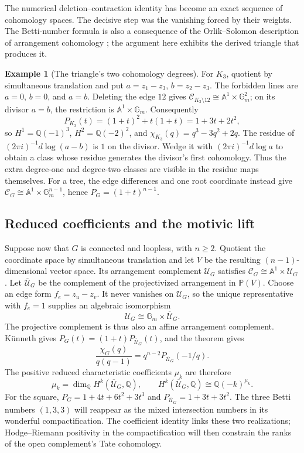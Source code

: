 \documentclass[11pt]{article}
\theoremstyle{definition}
\newtheorem{example}[theorem]{Example}
\theoremstyle{remark}
\newcommand{\Q}{\mathbb Q}
\newcommand{\A}{\mathbb A}
\newcommand{\Gm}{\mathbb G_m}
\begin{document}
The numerical deletion--contraction identity has become an exact sequence
of cohomology spaces. The decisive step was the vanishing forced by their
weights. The Betti-number formula is also a consequence of the
Orlik--Solomon description of arrangement cohomology
\cite[Theorem 5.2 and formula (1.4)]{dagOrlikSolomon1980}; the argument here
exhibits the derived triangle that produces it.

\begin{example}[The triangle's two cohomology degrees]
For $K_3$, quotient by simultaneous translation and put
$a=z_1-z_3$, $b=z_2-z_3$. The forbidden lines are $a=0$, $b=0$, and $a=b$.
Deleting the edge $12$ gives
$\mathcal C_{K_3\setminus12}\cong\A^1\times\Gm^2$;
on its divisor $a=b$, the restriction is $\A^1\times\Gm$.
Consequently
\[
 P_{K_3}(t)=(1+t)^2+t(1+t)=1+3t+2t^2,
\]
so $H^1=\Q(-1)^3$, $H^2=\Q(-2)^2$, and
$\chi_{K_3}(q)=q^3-3q^2+2q$.
The residue of $(2\pi i)^{-1}d\log(a-b)$ is $1$ on the divisor.
Wedge it with $(2\pi i)^{-1}d\log a$ to obtain a class whose residue
generates the divisor's first cohomology. Thus the extra degree-one and
degree-two classes are visible in the residue maps themselves.
For a tree, the edge differences and one root coordinate instead give
$\mathcal C_G\cong\A^1\times\Gm^{n-1}$, hence $P_G=(1+t)^{n-1}$.
\end{example}

\subsection{Reduced coefficients and the motivic lift}
\label{sec:dag-reduced-motivic}

Suppose now that $G$ is connected and loopless, with $n\ge2$.
Quotient the coordinate space by
simultaneous translation and let $V$ be the resulting $(n-1)$-dimensional
vector space. Its arrangement complement $\mathcal U_G$ satisfies
$\mathcal C_G\cong\A^1\times\mathcal U_G$.
Let $\overline{\mathcal U}_G$ be the complement of the projectivized
arrangement in $\mathbb P(V)$. Choose an edge form $f_e=z_u-z_v$.
It never vanishes on $\mathcal U_G$, so the unique representative with
$f_e=1$ supplies an algebraic isomorphism
\[
 \mathcal U_G\cong\Gm\times\overline{\mathcal U}_G.
\]
The projective complement is thus also an affine arrangement complement.
Künneth gives $P_G(t)=(1+t)P_{\overline{\mathcal U}_G}(t)$, and the theorem
gives
\[
 \frac{\chi_G(q)}{q(q-1)}
 =q^{n-2}P_{\overline{\mathcal U}_G}(-1/q).
\]
The positive reduced characteristic coefficients $\mu_k$ are therefore
\begin{equation}\label{eq:dag-reduced-betti}
 \mu_k=\dim_\Q H^k(\overline{\mathcal U}_G,\Q),\qquad
 H^k(\overline{\mathcal U}_G,\Q)\cong\Q(-k)^{\mu_k}.
\end{equation}
For the square, $P_G=1+4t+6t^2+3t^3$ and
$P_{\overline{\mathcal U}_G}=1+3t+3t^2$.
The three Betti numbers $(1,3,3)$ will reappear as the mixed intersection
numbers in its wonderful compactification. The coefficient identity links
these two realizations; Hodge--Riemann positivity in the compactification
will then constrain the ranks of the open complement's Tate cohomology.
\end{document}
